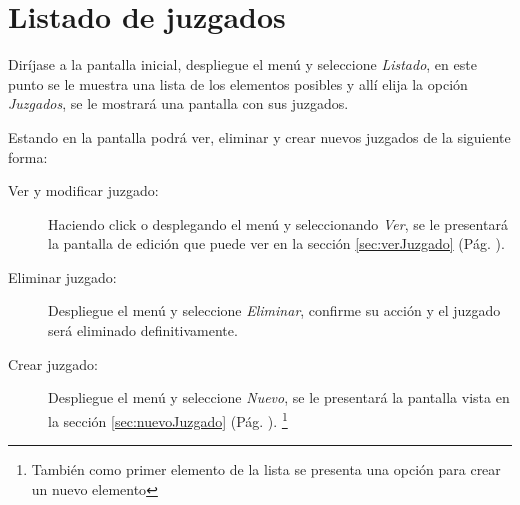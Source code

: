 \section{Listado de juzgados}
\label{sec:listadoJuzgados}
Dir\'ijase a la pantalla inicial, despliegue el men\'u \blackberry y seleccione
\emph{Listado}, en este punto se le muestra una lista de los elementos posibles
y all\'i elija la opci\'on \emph{Juzgados}, se le mostrar\'a una
pantalla con sus juzgados.

Estando en la pantalla podr\'a ver, eliminar y crear nuevos juzgados de la
siguiente forma:

\begin{description}
\item[Ver y modificar juzgado:]Haciendo click o desplegando el men\'u
\blackberry y seleccionando \emph{Ver}, se le presentar\'a la pantalla de
edici\'on que puede ver en la secci\'on \ref{sec:verJuzgado} (P\'ag.
\pageref{sec:verJuzgado}).
\item[Eliminar juzgado:]Despliegue el men\'u \blackberry y seleccione
\emph{Eliminar}, confirme su acci\'on y el juzgado ser\'a eliminado
definitivamente.
\item[Crear juzgado:]Despliegue el men\'u \blackberry y seleccione
\emph{Nuevo}, se le presentar\'a la pantalla vista en la
secci\'on \ref{sec:nuevoJuzgado}
(P\'ag. \pageref{sec:nuevoJuzgado}).
\footnote{Tambi\'en como primer elemento de la lista se presenta una opci\'on
para crear un nuevo elemento}
\end{description}
